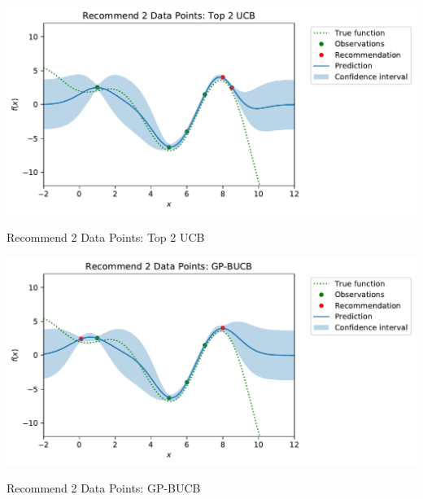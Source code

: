\vspace{0.5cm}
\begin{minipage}{\textwidth}
  \begin{minipage}[b]{0.49\textwidth}
    \centering
    \includegraphics[scale=0.45]{plots/Recommend 2 Data Points: Top 2 UCB.pdf}
     \captionsetup{type=figure}
     \vspace{-0.5cm}
    \caption{Recommend 2 Data Points: Top 2 UCB
    }
    \label{fig: Recommend 2 Data Points: Top 2 UCB.}
\end{minipage}
  \hfill
  \begin{minipage}[b]{0.49\textwidth}
    \centering
    \includegraphics[scale=0.45]{plots/Recommend 2 Data Points: GP-BUCB.pdf}
     \captionsetup{type=figure}
     \vspace{-0.5cm}
    \caption{Recommend 2 Data Points: GP-BUCB
    }
    \label{fig: Recommend 2 Data Points: GP-BUCB.}
 \end{minipage}
 \end{minipage}
 \vspace{0.5cm}







